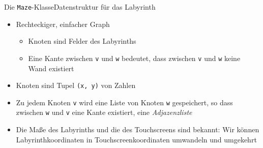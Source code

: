 \documentclass{beamer}
\begin{document}

\begin{frame}[fragile,t]{Die \verb~Maze~-Klasse}{Datenstruktur für das Labyrinth}
\begin{itemize}[<+->]
\item Rechteckiger, einfacher Graph
\begin{itemize}
\item Knoten sind Felder des Labyrinths
\item Eine Kante zwischen \verb+v+ und \verb+w+ bedeutet, dass zwischen \verb+v+ und \verb+w+ keine Wand existiert
\end{itemize}
\item Knoten sind Tupel \verb+(x, y)+ von Zahlen
\item Zu jedem Knoten \verb+v+ wird eine Liste von Knoten \verb+w+ gespeichert, so dass zwischen \verb+w+ und \verb+v+ eine Kante existiert, eine \textit{Adjazenzliste}
\item Die Maße des Labyrinths und die des Touchscreens sind bekannt: Wir können La\-by\-rinth\-ko\-or\-di\-na\-ten in Touch\-screen\-ko\-or\-di\-na\-ten umwandeln und umgekehrt
\end{itemize}
\end{frame}
\end{document}
